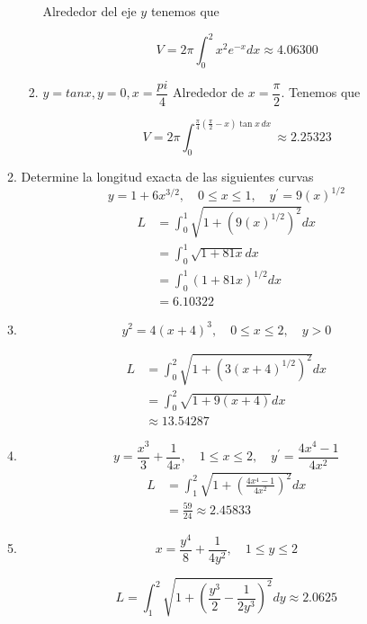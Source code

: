 \documentclass{report}
\begin{document}
\begin{enumerate}[label=\textcolor{Red}{\textbf{\arabic*.}}]
\begin{enumerate}[label=\textcolor{OliveGreen}{\textbf{\arabic*.}}]
\begin{enumerate}[label=\textcolor{OliveGreen}{\textbf{\roman*.}}]
                Alrededor del eje $y$ tenemos que

                $$
                V=2 \pi \int_{0}^{2} x^{2} e^{-x} d x \approx 4.06300
                $$

                \item $y = tanx, y= 0, x=\dfrac{pi}{4}$
                Alrededor de $x = \dfrac{\pi}{2}$. Tenemos que

                $$V = 2\pi\int_{0}^{\frac{\pi}{4}\left(\frac{\pi}{2}-x\right)\tan x\,dx} \approx 2.25323$$
            \end{enumerate}
            \item Determine la longitud exacta de las siguientes curvas
            $$
            y=1+6 x^{3 / 2}, \quad 0 \leq x \leq 1, \quad y^{\prime}=9(x)^{1 / 2}
            $$
            \begin{align*}
                L &= \int_{0}^{1} \sqrt{1+\left(9(x)^{1 / 2}\right)^{2}} dx \\
                &= \int_{0}^{1} \sqrt{1+81 x} dx \\
                &= \int_{0}^{1}(1+81 x)^{1 / 2} dx\\
                &= 6.10322
            \end{align*}

            \item $$
            y^{2}=4(x+4)^{3}, \quad 0 \leq x \leq 2, \quad y>0
            $$

            \begin{align*}
                L &= \int_{0}^{2} \sqrt{1 + \left(3(x+4)^{1/2}\right)^{2}} dx \\
                &= \int_{0}^{2} \sqrt{1 + 9(x+4)} dx \\
                &\approx 13.54287
            \end{align*}
            \item $$
            y=\frac{x^{3}}{3}+\frac{1}{4 x}, \quad 1 \leq x \leq 2, \quad y^{\prime}=\frac{4 x^{4}-1}{4 x^{2}}
            $$
            \begin{align*}
                L &= \int_{1}^{2} \sqrt{1+\left(\frac{4 x^{4}-1}{4 x^{2}}\right)^{2}} d x \\
                &= \frac{59}{24} \approx 2.45833
            \end{align*}
            \item $$
            x=\frac{y^{4}}{8}+\frac{1}{4 y^{2}}, \quad 1 \leq y \leq 2
            $$

            $$L=\int_{1}^{2} \sqrt{1+\left(\frac{y^{3}}{2}-\frac{1}{2 y^{3}}\right)^{2}} dy \approx 2.0625 $$


\end{enumerate}
\end{enumerate}
\end{document}
